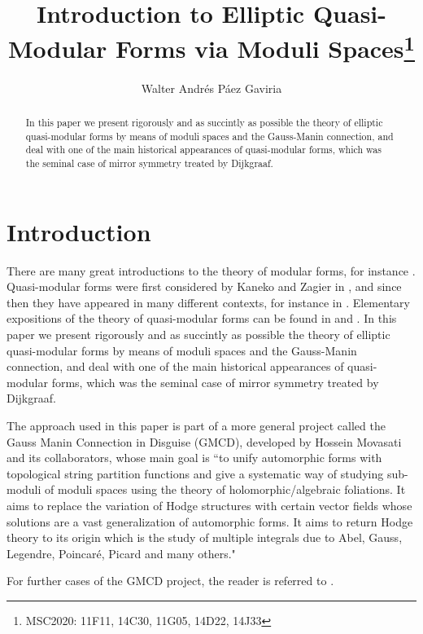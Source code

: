 \documentclass{article}
\title{Introduction to Elliptic Quasi-Modular Forms via Moduli Spaces\footnote{MSC2020: 11F11, 14C30, 11G05, 14D22, 14J33}}
\author[1]{Walter Andrés Páez Gaviria}
\affil[1]{Instituto de Matemática Pura e Aplicada. Rio de Janeiro, Brasil.}
\affil[1]{Institución Universitaria Politécnico Grancolombiano. Bogotá, Colombia.}
\date{}
\numberwithin{equation}{section}
\numberwithin{figure}{section}
\theoremstyle{plain}
\theoremstyle{definition}
\numberwithin{equation}{section}
\newtheorem[S, bodystyle=\normalfont\noindent]{defiS}{Definition}[section]
\begin{document}
\maketitle
\begin{abstract}
In this paper we present rigorously and as succintly as possible the theory of elliptic quasi-modular forms by means of moduli spaces and the Gauss-Manin connection, and deal with one of the main historical appearances of quasi-modular forms, which was the seminal case of mirror symmetry treated by Dijkgraaf.
\end{abstract}

\section{Introduction}

There are many great introductions to the theory of modular forms, for instance \parencite{123,diamond,koblitz1993,serre}. Quasi-modular forms were first considered by Kaneko and Zagier in \parencite{Kaneko}, and since then they have appeared in many different contexts, for instance in \parencite{mov2008,mov2012,pascal,dijkgraaf,ochiai}. Elementary expositions of the theory of quasi-modular forms can be found in \parencite[First lecture notes]{123} and \parencite{pascal}. In this paper we present rigorously and as succintly as possible the theory of elliptic quasi-modular forms by means of moduli spaces and the Gauss-Manin connection, and deal with one of the main historical appearances of quasi-modular forms, which was the seminal case of mirror symmetry treated by Dijkgraaf.

The approach used in this paper is part of a more general project called the Gauss Manin Connection in Disguise (GMCD), developed by Hossein Movasati and its collaborators, whose main goal is ``to unify  automorphic forms with topological string partition functions and give a systematic way of studying sub-moduli  of moduli spaces using the theory of holomorphic/algebraic  foliations. It aims to replace the variation of Hodge structures with certain vector fields whose solutions are a vast generalization of automorphic forms. It aims to return Hodge theory to its origin which is the study of multiple integrals due to Abel, Gauss, Legendre, Poincaré, Picard and many others."

For further cases of the GMCD project, the reader is referred to \parencite{Movasati2015Hecke,AlimMovasatiScheideggerYau2016,Movasati2017NoetherLefschetz,HaghighatMovasatiYau2017,MovasatiNikdelan2021Dwork,AlimVogrin2021GaussManinLieK3,CaoMovasatiVillaflorLoyola2024,Paez2025}.
\end{document}
